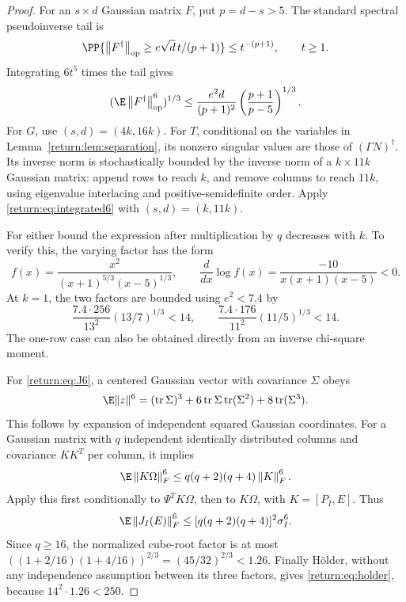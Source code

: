 \documentclass[11pt,oneside,openany,a4paper]{book}
\numberwithin{equation}{chapter}
\theoremstyle{definition}
\theoremstyle{remark}
\newcommand{\F}[1]{\left\lVert#1\right\rVert_F}
\newcommand{\op}[1]{\left\lVert#1\right\rVert_{\rm op}}
\DeclareMathOperator{\tr}{tr}\DeclareMathOperator{\rank}{rank}
\begin{document}
\begin{proof}
For an $s\times d$ Gaussian matrix $F$, put $p=d-s>5$. The standard spectral pseudoinverse tail \cite[Sec.~10.1, Eq.~(71) in the arXiv HTML rendering]{HMT} is
\[
 \PP\{\op{F^\dagger}\ge e\sqrt d\,t/(p+1)\}\le t^{-(p+1)},\qquad t\ge1.
\]
Integrating $6t^5$ times the tail gives
\begin{equation}\label{return:eq:integrated6}
 (\E\op{F^\dagger}^6)^{1/3}
 \le\frac{e^2d}{(p+1)^2}\left(\frac{p+1}{p-5}\right)^{1/3}.
\end{equation}
For $G$, use $(s,d)=(4k,16k)$. For $T$, conditional on the variables in Lemma~\ref{return:lem:separation}, its nonzero singular values are those of $(\Gamma N)^\dagger$. Its inverse norm is stochastically bounded by the inverse norm of a $k\times11k$ Gaussian matrix: append rows to reach $k$, and remove columns to reach $11k$, using eigenvalue interlacing and positive-semidefinite order. Apply \eqref{return:eq:integrated6} with $(s,d)=(k,11k)$.

For either bound the expression after multiplication by $q$ decreases with $k$. To verify this, the varying factor has the form
\[
 f(x)=\frac{x^2}{(x+1)^{5/3}(x-5)^{1/3}},\qquad
 \frac{d}{dx}\log f(x)=\frac{-10}{x(x+1)(x-5)}<0.
\]
At $k=1$, the two factors are bounded using $e^2<7.4$ by
\[
 \frac{7.4\cdot256}{13^2}(13/7)^{1/3}<14,
 \qquad
 \frac{7.4\cdot176}{11^2}(11/5)^{1/3}<14.
\]
The one-row case can also be obtained directly from an inverse chi-square moment.

For \eqref{return:eq:J6}, a centered Gaussian vector with covariance $\Sigma$ obeys
\[
 \E\|z\|^6=(\tr\Sigma)^3+6\tr\Sigma\tr(\Sigma^2)
                         +8\tr(\Sigma^3).
\]
This follows by expansion of independent squared Gaussian coordinates. For a Gaussian matrix with $q$ independent identically distributed columns and covariance $K K^T$ per column, it implies
\[
 \E\F{K\Omega}^6\le q(q+2)(q+4)\F K^6.
\]
Apply this first conditionally to $\Psi^TK\Omega$, then to $K\Omega$, with $K=[P_I,E]$. Thus
\[
 \E\F{J_I(E)}^6\le[q(q+2)(q+4)]^2\sigma_I^6.
\]
Since $q\ge16$, the normalized cube-root factor is at most
$((1+2/16)(1+4/16))^{2/3}=(45/32)^{2/3}<1.26$.
Finally H\"older, without any independence assumption between its three factors, gives \eqref{return:eq:holder}, because $14^2\cdot1.26<250$.
\end{proof}
\end{document}
